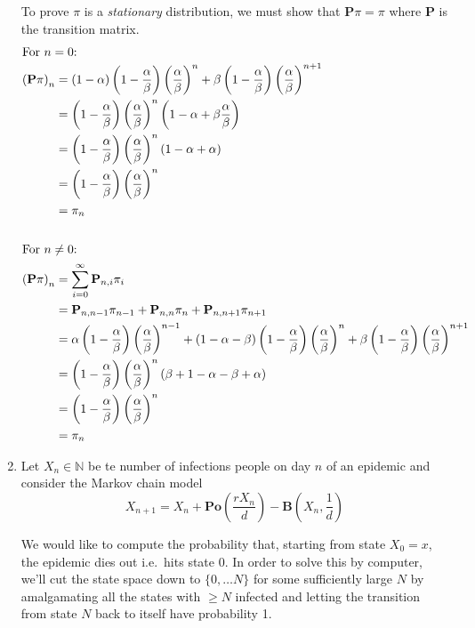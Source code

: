 \documentclass[10pt,\jkfside,a4paper]{article}
\begin{document}
\begin{enumerate}
To prove $\pi$ is a \textit{stationary} distribution, we must show that
$\mathbf{P}\pi = \pi$ where $\mathbf{P}$ is the transition matrix.
\begin{align*}
\intertext{For $n = 0$:}
\left(\mathbf{P}\pi\right)_n
&= \left( 1 - \alpha \right)\left( 1 - \frac{\alpha}{\beta} \right)\left(
\frac{\alpha}{\beta} \right)^n + \beta \left( 1 - \frac{\alpha}{\beta} \right)
\left( \frac{\alpha}{\beta} \right)^{n+1} \\
&= \left( 1 - \frac{\alpha}{\beta} \right)\left( \frac{\alpha}{\beta}
\right)^n\left( 1 - \alpha + \beta\frac{\alpha}{\beta} \right) \\
&= \left( 1 - \frac{\alpha}{\beta} \right)\left( \frac{\alpha}{\beta}
\right)^n\left( 1 - \alpha + \alpha \right) \\
&= \left( 1 - \frac{\alpha}{\beta} \right)\left( \frac{\alpha}{\beta}
\right)^n \\
&= \pi_n \\\\
\intertext{For $n \neq 0$:}
\left(\mathbf{P}\pi\right)_n
&= \sum^{\infty}_{i=0} \mathbf{P}_{n, i} \pi_i \\
&= \mathbf{P}_{n, n-1}\pi_{n-1} + \mathbf{P}_{n, n}\pi_n +
\mathbf{P}_{n, n+1} \pi_{n+1} \\
&= \alpha \left( 1 - \frac{\alpha}{\beta} \right)\left( \frac{\alpha}{\beta}
\right)^{n-1} + (1 - \alpha - \beta)\left( 1 - \frac{\alpha}{\beta} \right)
\left( \frac{\alpha}{\beta} \right)^n + \beta \left( 1 -
\frac{\alpha}{\beta} \right)\left( \frac{\alpha}{\beta}
\right)^{n+1} \\
&= \left( 1 - \frac{\alpha}{\beta} \right)\left( \frac{\alpha}{\beta}
\right)^n\left( \beta + 1 - \alpha - \beta + \alpha \right) \\
&= \left( 1 - \frac{\alpha}{\beta} \right)\left( \frac{\alpha}{\beta}
\right)^n \\
&= \pi_n \\
\end{align*}

\item Let $X_n \in \mathbb{N}$ be te number of infections people on day $n$
of an epidemic and consider the Markov chain model
\[
X_{n+1} = X_n + \mathbf{Po}\left(\frac{rX_n}{d}\right) - \mathbf{B}\left( X_n,
\frac{1}{d} \right)
\]

We would like to compute the probability that, starting from state $X_0 =
x$, the epidemic dies out i.e.\ hits state 0. In order to solve this by
computer, we'll cut the state space down to $\{0, \dots N\}$ for some
sufficiently large $N$ by amalgamating all the states with $\geq N$ infected
and letting the transition from state $N$ back to itself have probability 1.


\end{enumerate}
\end{document}
